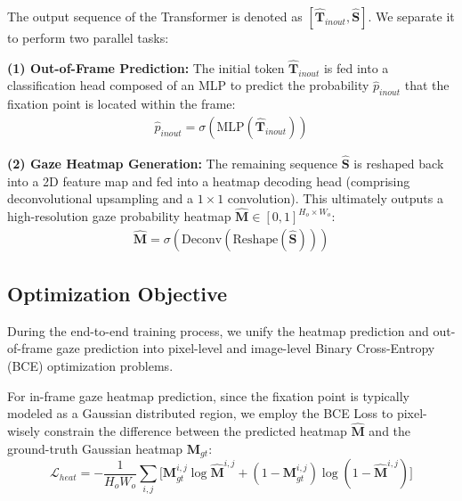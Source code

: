 \documentclass[sigconf,review,anonymous,screen]{acmart}
\begin{document}
The output sequence of the Transformer is denoted as $[\hat{\mathbf{T}}_{inout}, \hat{\mathbf{S}}]$. We separate it to perform two parallel tasks:

\textbf{(1) Out-of-Frame Prediction:} The initial token $\hat{\mathbf{T}}_{inout}$ is fed into a classification head composed of an MLP to predict the probability $\hat{p}_{inout}$ that the fixation point is located within the frame:
\begin{equation}
\label{eq:out_of_frame_prob}
    \begin{aligned}
    \hat{p}_{inout} = \sigma(\text{MLP}(\hat{\mathbf{T}}_{inout}))
    \end{aligned}
\end{equation}

\textbf{(2) Gaze Heatmap Generation:} The remaining sequence $\hat{\mathbf{S}}$ is reshaped back into a 2D feature map and fed into a heatmap decoding head (comprising deconvolutional upsampling and a $1 \times 1$ convolution). This ultimately outputs a high-resolution gaze probability heatmap $\hat{\mathbf{M}} \in [0, 1]^{H_o \times W_o}$:
\begin{equation}
\label{eq:heatmap_generation}
    \begin{aligned}
    \hat{\mathbf{M}} = \sigma(\text{Deconv}(\text{Reshape}(\hat{\mathbf{S}})))
    \end{aligned}
\end{equation}

\subsection{Optimization Objective}

During the end-to-end training process, we unify the heatmap prediction and out-of-frame gaze prediction into pixel-level and image-level Binary Cross-Entropy (BCE) optimization problems.

For in-frame gaze heatmap prediction, since the fixation point is typically modeled as a Gaussian distributed region, we employ the BCE Loss to pixel-wisely constrain the difference between the predicted heatmap $\hat{\mathbf{M}}$ and the ground-truth Gaussian heatmap $\mathbf{M}_{gt}$:
\begin{equation}
\label{eq:loss_heat}
    \mathcal{L}_{heat} = -\frac{1}{H_o W_o} \sum_{i,j} \bigl[ \mathbf{M}_{gt}^{i,j} \log \hat{\mathbf{M}}^{i,j} + (1 - \mathbf{M}_{gt}^{i,j}) \log (1 - \hat{\mathbf{M}}^{i,j}) \bigr]
\end{equation}
\end{document}

